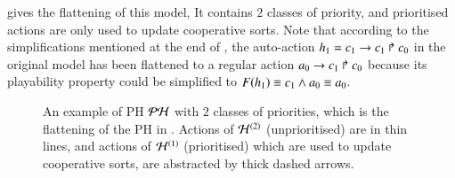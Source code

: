  gives the flattening of this model,
%
It contains $2$ classes of priority, and prioritised actions are only used to update cooperative sorts.
Note that according to the simplifications mentioned at the end of ,
the auto-action $h_1 = c_1\rightarrow c_1\Rsh c_0$ in the original model has been flattened to a regular action $a_0\rightarrow c_1\Rsh c_0$
because its playability property could be simplified to $F(h_1) \equiv c_1 \wedge a_0 \equiv a_0$.

\begin{figure}[p]
  \centering
  \caption{
  \label{fig:metazoan-ph}
    An example of PH $\mathcal{PH}$ with $2$ classes of priorities,
    which is the flattening of the PH in .
    Actions of $\mathcal{H}^{(2)}$ (unprioritised) are in thin lines,
    and actions of $\mathcal{H}^{(1)}$ (prioritised) which are used to update cooperative sorts,
    are abstracted by thick dashed arrows.
  }
\end{figure}

